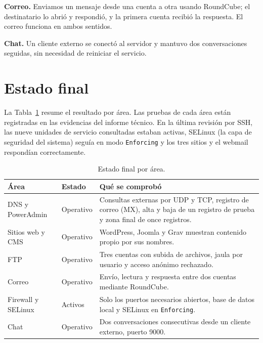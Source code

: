 \documentclass[11pt,a4paper]{article}
\begin{document}
\textbf{Correo.} Enviamos un mensaje desde una cuenta a otra usando RoundCube; el destinatario lo abrió y respondió, y la primera cuenta recibió la respuesta. El correo funciona en ambos sentidos.

\textbf{Chat.} Un cliente externo se conectó al servidor y mantuvo dos conversaciones seguidas, sin necesidad de reiniciar el servicio.

\section{Estado final}
La Tabla~\ref{tab:estado-ejecutivo} resume el resultado por área. Las pruebas de cada área están registradas en las evidencias del informe técnico. En la última revisión por SSH, las nueve unidades de servicio consultadas estaban activas, SELinux (la capa de seguridad del sistema) seguía en modo \texttt{Enforcing} y los tres sitios y el webmail respondían correctamente.

\begin{table}[htbp]\centering\small
\caption{Estado final por área.}\label{tab:estado-ejecutivo}
\renewcommand{\arraystretch}{1.12}
\begin{tabularx}{\linewidth}{@{}p{3.1cm}p{2.6cm}X@{}}\toprule
Área & Estado & Qué se comprobó \\\midrule
DNS y PowerAdmin & Operativo & Consultas externas por UDP y TCP, registro de correo (MX), alta y baja de un registro de prueba y zona final de once registros. \\
Sitios web y CMS & Operativo & WordPress, Joomla y Grav muestran contenido propio por sus nombres. \\
FTP & Operativo & Tres cuentas con subida de archivos, jaula por usuario y acceso anónimo rechazado. \\
Correo & Operativo & Envío, lectura y respuesta entre dos cuentas mediante RoundCube. \\
Firewall y SELinux & Activos & Solo los puertos necesarios abiertos, base de datos local y SELinux en \texttt{Enforcing}. \\
Chat & Operativo & Dos conversaciones consecutivas desde un cliente externo, puerto 9000. \\
\bottomrule\end{tabularx}
\end{table}
\end{document}
